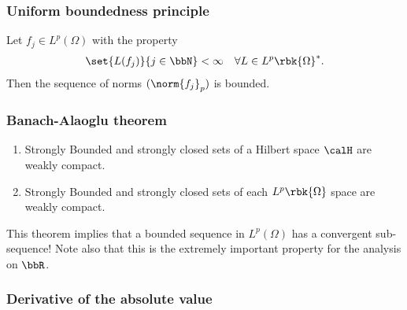 \documentclass[openany, a4paper, oneside]{jsbook}
\begin{document}
\subsubsection{Uniform boundedness principle}

\begin{thm}\label{Lieb-Loss_Analysis_chap11_2}
 Let $f_j \in L^p (\Omega)$ with the property
\begin{align}
 \set{L (f_j)}{j \in \bbN} < \infty \quad \forall L \in L^p \rbk{\Omega}^*.
\end{align}
Then the sequence of norms $(\norm{f_j}_p)$ is bounded.
\end{thm}
\subsubsection{Banach-Alaoglu theorem}

\begin{thm}\label{Lieb-Loss_Analysis_chap11_8}
\begin{enumerate}
\item Strongly Bounded and strongly closed sets of a Hilbert space $\calH$ are weakly compact.
\item Strongly Bounded and strongly closed sets of each $L^p \rbk{\Omega}$ space are weakly compact.
\end{enumerate}
\end{thm}
\begin{rem}
 This theorem implies that a  bounded sequence in $L^p (\Omega)$ has a  convergent sub-sequence!
 Note also that this is the extremely important property for the analysis on $\bbR$.
\end{rem}
\subsubsection{Derivative of the absolute value}
\end{document}
